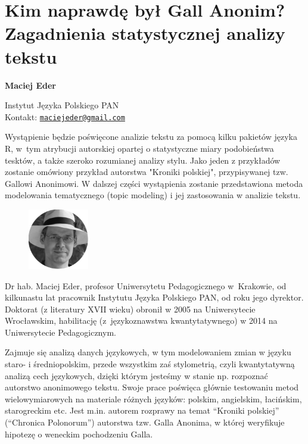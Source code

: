 \documentclass[\main/boa.tex]{subfiles}
\begin{document}
\section[Kim naprawdę był Gall Anonim? Zagadnienia statystycznej analizy tekstu]{Kim naprawdę był Gall Anonim? \\Zagadnienia statystycznej analizy tekstu}


\begin{minipage}{0.915\textwidth}
	\centering
  {\bf \LARGE {} Maciej Eder}
\end{minipage}



\begin{affiliations}
\begin{minipage}{0.915\textwidth}
\centering
\large Instytut Języka Polskiego PAN  \\[1pt]
Kontakt: \href{mailto:maciejeder@gmail.com}{\nolinkurl{maciejeder@gmail.com}}\\
\end{minipage}
\end{affiliations}


Wystąpienie będzie poświęcone analizie tekstu za pomocą kilku pakietów języka R, w~tym atrybucji autorskiej opartej o statystyczne miary podobieństwa tesktów, a także szeroko rozumianej analizy stylu. Jako jeden z przykładów zostanie omówiony przykład autorstwa "Kroniki polskiej", przypisywanej tzw. Gallowi Anonimowi. W dalszej części wystąpienia zostanie przedstawiona metoda modelowania tematycznego (topic modeling) i jej zastosowania w analizie tekstu. 

\bio
\begin{figure}
    \includegraphics[width=100px]{img/guests/czarno_biale/meder-crop.png}
\end{figure} 
Dr hab. Maciej Eder, profesor Uniwersytetu Pedagogicznego w~Krakowie, od kilkunastu lat pracownik Instytutu Języka Polskiego PAN, od roku jego dyrektor. Doktorat (z literatury XVII wieku) obronił w 2005 na Uniwersytecie Wrocławskim, habilitację (z~językoznawstwa kwantytatywnego) w 2014 na Uniwersytecie Pedagogicznym.

Zajmuje się analizą danych językowych, w tym modelowaniem zmian w języku staro- i średniopolskim, przede wszystkim zaś stylometrią, czyli kwantytatywną analizą cech językowych, dzięki którym jesteśmy w stanie np. rozpoznać autorstwo anonimowego tekstu. Swoje prace poświęca głównie testowaniu metod wielowymiarowych na materiale różnych języków: polskim, angielskim, łacińskim, starogreckim etc. Jest m.in. autorem rozprawy na temat “Kroniki polskiej” (“Chronica Polonorum”) autorstwa tzw. Galla Anonima, w której weryfikuje hipotezę o weneckim pochodzeniu Galla.
\end{document}
